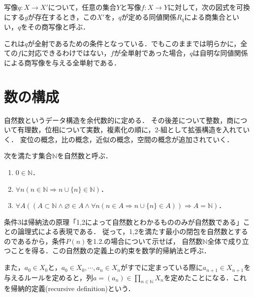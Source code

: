 \documentclass[uplatex,dvipdfmx]{jsreport}
\begin{document}
\begin{definition}
    写像$q:X\to X'$について，任意の集合$Y$と写像$f:X\to Y$に対して，次の図式を可換にする$g$が存在するとき，この$X'$を，$q$が定める同値関係$R_q$による商集合といい，$q$をその商写像と呼ぶ．
    \begin{center}\end{center}
\end{definition}
\begin{remark}
    これは$q$が全射であるための条件となっている．でもこのままでは明らかに，全ての$f$に対応できるわけではない，$f$が全単射であった場合，$q$は自明な同値関係による商写像を与える全単射である．
\end{remark}

\section{数の構成}

\begin{screen}
    自然数というデータ構造を余代数的に定める．
    その後差について整数，商について有理数，位相について実数，複素化の順に，2-組として拡張構造を入れていく．
    変位の概念，比の概念，近似の概念，空間の概念が追加されていく．
\end{screen}

\begin{definition}
    次を満たす集合$\mathbb{N}$を自然数と呼ぶ．
    \begin{enumerate}
        \item $0\in\mathbb{N}$．
        \item $\forall n(n\in\mathbb{N}\Rightarrow n\cup\{ n\}\in\mathbb{N})$．
        \item $\forall A((A\subset\mathbb{N}\wedge\varnothing\in A\wedge\forall n(n\in A\Rightarrow n\cup\{n\}\in A))\Rightarrow A=\mathbb{N})$．
    \end{enumerate}
\end{definition}
\begin{remark}
    条件3は帰納法の原理「1,2によって自然数とわかるもののみが自然数である」ことの論理式による表現である．
    従って，1,2を満たす最小の閉包を自然数とするのであるから，条件$P(n)$を1.2.の場合について示せば，
    自然数$\mathbb{N}$全体で成り立つことを得る．この自然数の定義上の約束を数学的帰納法と呼ぶ．

    また，$a_0\in X_0$と，$a_0\in X_0,\cdots,a_n\in X_n$がすでに定まっている際に$a_{n+1}\in X_{n+1}$を与えるルールを定めると，列$a=(a_n)\in\prod_{n\in\mathbb{N}}X_n$を定めたことになる．これを帰納的定義(recursive definition)という．
\end{remark}
\end{document}
